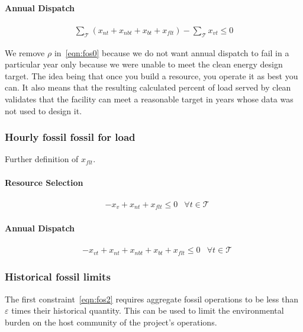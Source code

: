 \documentclass[9pt, oneside]{article}
\numberwithin{equation}{subsubsection}
\begin{document}
\paragraph{Annual Dispatch}
\begin{subequations}
	\begin{align}
		 & \sum_{ \mathcal{T}} \left( x_{nt} + x_{nbt} + x_{bt}+ x_{flt} \right) - \sum_{ \mathcal{T}} x_{vt} \leq 0 & \label{eqn:fos0}
	\end{align}
\end{subequations}

We remove $\rho$ in~\ref{eqn:fos0} because we do not want annual dispatch to fail in a particular year only because we were unable to meet the clean energy design target.
The idea being that once you build a resource, you operate it as best you can.
It also means that the resulting calculated percent of load served by clean validates that the facility can meet a reasonable target in years whose data was not used to design it.

\subsubsection{Hourly fossil fossil for load}
Further definition of $x_{flt}$.

\paragraph{Resource Selection}
\begin{subequations}
	\begin{align}
		 & -x_v + x_{nt} + x_{flt} \leq 0 & \forall t \in \mathcal{T}\label{eqn:fos3}
	\end{align}
\end{subequations}

\paragraph{Annual Dispatch}
\begin{subequations}
	\begin{align}
		 & -x_{vt} + x_{nt} + x_{nbt} + x_{bt} + x_{flt} \leq 0 & \forall t \in \mathcal{T}\label{eqn:fos3}
	\end{align}
\end{subequations}

\subsubsection{Historical fossil limits}
The first constraint~\ref{eqn:fos2} requires aggregate fossil operations to be less than $\varepsilon$ times their historical quantity.
This can be used to limit the environmental burden on the host community of the project’s operations.
\end{document}
